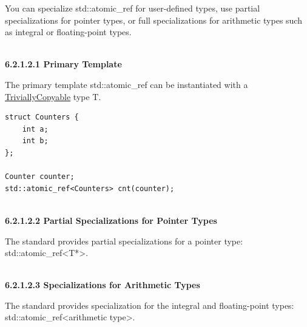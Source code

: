 You can specialize std::atomic\_ref for user-defined types, use partial specializations for pointer types, or full specializations for arithmetic types such as integral or floating-point types.

\hspace*{\fill} \\ %
\noindent
\textbf{6.2.1.2.1\hspace{0.2cm} Primary Template}

The primary template std::atomic\_ref can be instantiated with a \href{https://en.cppreference.com/w/cpp/types/is_trivially_copyable}{TriviallyCopyable} type T.

\begin{lstlisting}[style=styleCXX]
struct Counters {
	int a;
	int b;
};

Counter counter;
std::atomic_ref<Counters> cnt(counter);
\end{lstlisting}

\hspace*{\fill} \\ %
\noindent
\textbf{6.2.1.2.2\hspace{0.2cm} Partial Specializations for Pointer Types}

The standard provides partial specializations for a pointer type: std::atomic\_ref<T*>.

\hspace*{\fill} \\ %
\noindent
\textbf{6.2.1.2.3\hspace{0.2cm} Specializations for Arithmetic Types}

The standard provides specialization for the integral and floating-point types: std::atomic\_ref<arithmetic type>.

